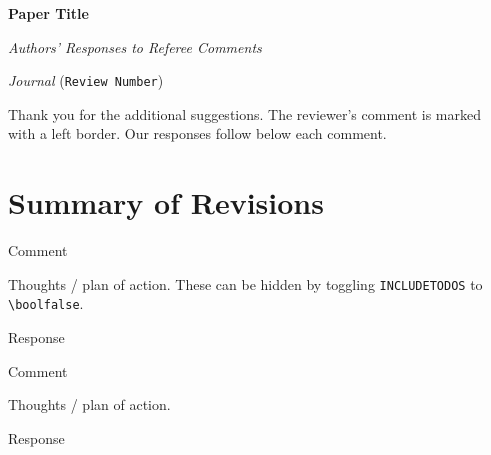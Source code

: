 \documentclass[12pt]{article}
\begin{document}
\begin{center}
    {\large\bf Paper Title}
    
    \emph{Authors' Responses to Referee Comments}
    
    \emph{Journal} (\texttt{Review Number})
\end{center}

\noindent Thank you for the additional suggestions. The reviewer's comment is marked with a left border. Our responses follow below each comment.

\section*{Summary of Revisions}



\begin{refcomment}
  Comment 
\end{refcomment}

\begin{todos}
  Thoughts / plan of action. These can be hidden by toggling \texttt{INCLUDETODOS} to \texttt{\textbackslash boolfalse}. 
\end{todos}

\begin{response}
  Response
\end{response}



\begin{refcomment}
  Comment 
\end{refcomment}

\begin{todos}
  Thoughts / plan of action. 
\end{todos}

\begin{response}
  Response
\end{response}


\end{document}

